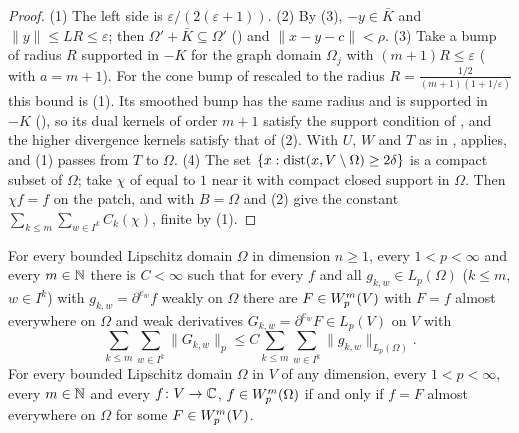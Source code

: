 \begin{proof}
\leanok
(1) The left side is $\varepsilon / (2 (\varepsilon + 1))$. (2) By
 (3), $-y \in \bar K$ and $\|y\| \leq L R \leq \varepsilon$;
then $\Omega' + \bar K \subseteq \Omega'$ () and
$\|x - y - c\| < \rho$. (3) Take a bump of radius $R$ supported in $-K$ for the graph domain
$\Omega_j$ with $(m + 1) R \leq \varepsilon$ ( with $a = m + 1$).
For the cone bump of  rescaled to the radius
$R = \frac{1/2}{(m + 1)(1 + 1/\varepsilon)}$ this bound is (1). Its smoothed bump has the
same radius and is supported in $-K$ (), so its dual kernels of order
$m + 1$ satisfy the support condition of , and the higher divergence kernels
satisfy that of (2). With $U$, $W$ and $T$ as in ,
 applies, and  (1) passes
from $T$ to $\Omega$. (4) The set $\{x : \operatorname{dist}(x, V \setminus \Omega) \geq 2 \delta\}$ is a
compact subset of $\Omega$; take $\chi$ of  equal to $1$ near it
with compact closed support in $\Omega$. Then $\chi f = f$ on the patch, and
 with $B = \Omega$ and  (2) give
the constant $\sum_{k \leq m} \sum_{w \in I^k} C_k(\chi)$, finite by
 (1).
\end{proof}

\begin{theorem}
\label{thm:higher-sobolev-extension}
\leanok
{}
For every bounded Lipschitz domain $\Omega$ in dimension $n \geq 1$, every $1 < p < \infty$ and
every $m \in \mathbb{N}$ there is $C < \infty$ such that for every $f$ and all
$g_{k,w} \in L_p(\Omega)$ ($k \leq m$, $w \in I^k$) with $g_{k,w} = \partial^{e_w} f$ weakly on
$\Omega$ there are $F \in W^{m}_{p}(V)$ with $F = f$ almost everywhere on $\Omega$ and weak
derivatives $G_{k,w} = \partial^{e_w} F \in L_p(V)$ on $V$ with
\[
  \sum_{k \leq m} \sum_{w \in I^k} \|G_{k,w}\|_p \leq C \sum_{k \leq m} \sum_{w \in I^k}
  \|g_{k,w}\|_{L_p(\Omega)} .
\]
For every bounded Lipschitz domain $\Omega$ in $V$ of any dimension, every $1 < p < \infty$,
every $m \in \mathbb{N}$ and every $f \colon V \to \mathbb{C}$, $f \in W^{m}_{p}(\Omega)$ if and only if
$f = F$ almost everywhere on $\Omega$ for some $F \in W^{m}_{p}(V)$.
\end{theorem}

